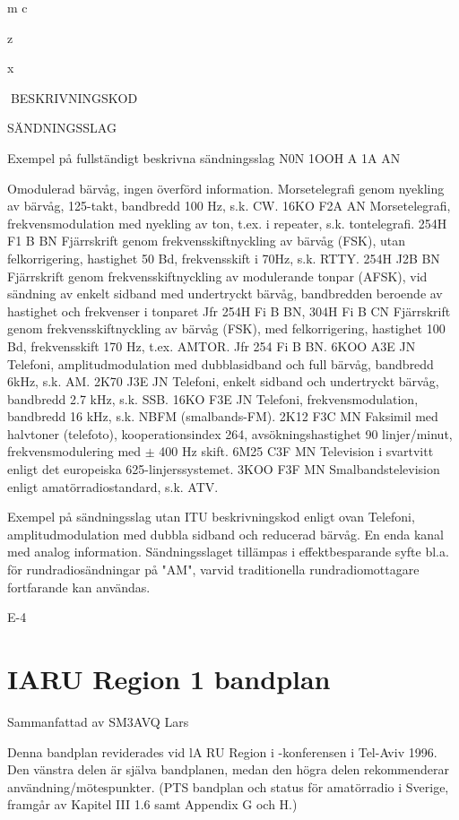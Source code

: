 \documentclass[a4paper,twoside,twocolumn,openright]{book}
\begin{document}
{{{{{{{{{{{m
c

z

x

BESKRIVNINGSKOD

SÄNDNINGSSLAG

Exempel på fullständigt beskrivna sändningsslag
N0N
1OOH A 1A AN

Omodulerad bärvåg, ingen överförd information.
Morsetelegrafi genom nyekling av bärvåg, 125-takt, bandbredd 100 Hz, s.k. CW.
16KO F2A AN Morsetelegrafi, frekvensmodulation med nyekling av ton,
t.ex. i repeater, s.k. tontelegrafi.
254H F1 B BN Fjärrskrift genom frekvensskiftnyckling av bärvåg (FSK),
utan felkorrigering, hastighet 50 Bd, frekvensskift i 70Hz,
s.k. RTTY.
254H J2B BN Fjärrskrift genom frekvensskiftnyckling av modulerande
tonpar (AFSK), vid sändning av enkelt sidband med undertryckt bärvåg, bandbredden beroende av hastighet och
frekvenser i tonparet
Jfr 254H Fi B BN,
304H Fi B CN Fjärrskrift genom frekvensskiftnyckling av bärvåg (FSK),
med felkorrigering, hastighet 100 Bd, frekvensskift 170
Hz, t.ex. AMTOR. Jfr 254 Fi B BN.
6KOO A3E JN Telefoni, amplitudmodulation med dubblasidband och full
bärvåg, bandbredd 6kHz, s.k. AM.
2K70 J3E JN Telefoni, enkelt sidband och undertryckt bärvåg, bandbredd 2.7 kHz, s.k. SSB.
16KO F3E JN
Telefoni, frekvensmodulation, bandbredd 16 kHz, s.k.
NBFM (smalbands-FM).
2K12 F3C MN Faksimil med halvtoner (telefoto), kooperationsindex 264,
avsökningshastighet 90 linjer/minut, frekvensmodulering
med $\pm$ 400 Hz skift.
6M25 C3F MN Television i svartvitt enligt det europeiska 625-linjerssystemet.
3KOO F3F MN Smalbandstelevision enligt amatörradiostandard, s.k. ATV.

Exempel på sändningsslag utan ITU beskrivningskod enligt ovan
Telefoni, amplitudmodulation med dubbla sidband och
reducerad bärvåg.
En enda kanal med analog information.
Sändningsslaget tillämpas i effektbesparande syfte bl.a.
för rundradiosändningar på "AM", varvid traditionella
rundradiomottagare fortfarande kan användas.

E-4

\chapter{IARU Region 1 bandplan}

Sammanfattad av SM3AVQ Lars

Denna bandplan reviderades vid lA RU Region i -konferensen i Tel-Aviv 1996.
Den vänstra delen är själva bandplanen, medan den högra delen rekommenderar användning/mötespunkter.
(PTS bandplan och status för amatörradio i Sverige, framgår av Kapitel III 1.6 samt Appendix G och H.)

}}}}}}}}}}}
\end{document}
